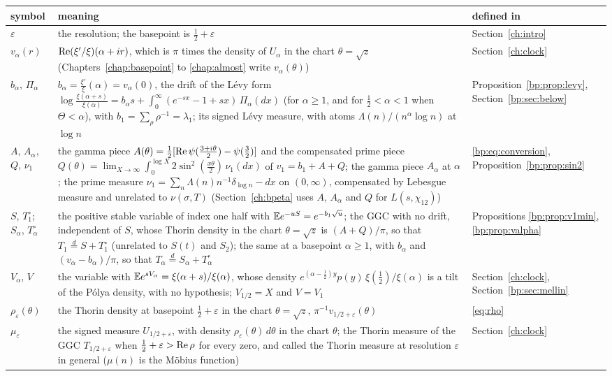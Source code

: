 {\small
\begin{longtable}{@{}p{}p{}p{}@{}}
\toprule
symbol & meaning & defined in\\
\midrule
\endhead
$\varepsilon$ & \raggedright the resolution; the basepoint is $\frac12+\varepsilon$ & \raggedright Section~\ref{ch:intro}\tabularnewline
$v_\alpha(r)$ & \raggedright $\operatorname{Re}(\xi'/\xi)(\alpha+ir)$, which is $\pi$ times the density of $U_\alpha$ in the chart $\theta=\sqrt z$ (Chapters~\ref{chap:basepoint} to \ref{chap:almost} write $v_\alpha(\theta)$) & \raggedright Section~\ref{ch:clock}\tabularnewline
$b_\alpha$, $\Pi_\alpha$ & \raggedright $b_\alpha=\frac{\xi'}\xi(\alpha)=v_\alpha(0)$, the drift of the L\'evy form $\log\frac{\xi(\alpha+s)}{\xi(\alpha)}=b_\alpha s+\int_0^\infty(e^{-sx}-1+sx)\,\Pi_\alpha(dx)$ (for $\alpha\ge1$, and for $\frac12<\alpha<1$ when $\Theta<\alpha$), with $b_1=\sum_\rho\rho^{-1}=\lambda_1$; its signed L\'evy measure, with atoms $\Lambda(n)/(n^\alpha\log n)$ at $\log n$ & \raggedright Proposition~\ref{bp:prop:levy}, Section~\ref{bp:sec:below}\tabularnewline
$A$, $A_\alpha$, $Q$, $\nu_1$ & \raggedright the gamma piece $A(\theta)=\frac12[\operatorname{Re}\psi(\frac{3+i\theta}2)-\psi(\frac32)]$ and the compensated prime piece $Q(\theta)=\lim_{X\to\infty}\int_0^{\log X}2\sin^2(\frac{x\theta}2)\,\nu_1(dx)$ of $v_1=b_1+A+Q$; the gamma piece $A_\alpha$ at $\alpha$; the prime measure $\nu_1=\sum_n\Lambda(n)n^{-1}\delta_{\log n}-dx$ on $(0,\infty)$, compensated by Lebesgue measure and unrelated to $\nu(\sigma,T)$ (Section~\ref{ch:bpeta} uses $A$, $A_\alpha$ and $Q$ for $L(s,\chi_{12})$) & \raggedright \eqref{bp:eq:conversion}, Proposition~\ref{bp:prop:sin2}\tabularnewline
$S$, $T_1^\circ$; $S_\alpha$, $T_\alpha^\circ$ & \raggedright the positive stable variable of index one half with $\mathbb{E} e^{-uS}=e^{-b_1\sqrt u}$; the GGC with no drift, independent of $S$, whose Thorin density in the chart $\theta=\sqrt z$ is $(A+Q)/\pi$, so that $T_1\stackrel d=S+T_1^\circ$ (unrelated to $S(t)$ and $S_2$); the same at a basepoint $\alpha\ge1$, with $b_\alpha$ and $(v_\alpha-b_\alpha)/\pi$, so that $T_\alpha\stackrel d=S_\alpha+T_\alpha^\circ$ & \raggedright Propositions \ref{bp:prop:v1min}, \ref{bp:prop:valpha}\tabularnewline
$V_\alpha$, $V$ & \raggedright the variable with $\mathbb{E} e^{sV_\alpha}=\xi(\alpha+s)/\xi(\alpha)$, whose density $e^{(\alpha-\frac12)y}p(y)\,\xi(\frac12)/\xi(\alpha)$ is a tilt of the P\'olya density, with no hypothesis; $V_{1/2}=X$ and $V=V_1$ & \raggedright Section~\ref{ch:clock}, Section~\ref{bp:sec:mellin}\tabularnewline
$\rho_\varepsilon(\theta)$ & \raggedright the Thorin density at basepoint $\frac12+\varepsilon$ in the chart $\theta=\sqrt z$, $\pi^{-1}v_{1/2+\varepsilon}(\theta)$ & \raggedright \eqref{eq:rho}\tabularnewline
$\mu_\varepsilon$ & \raggedright the signed measure $U_{1/2+\varepsilon}$, with density $\rho_\varepsilon(\theta)\,d\theta$ in the chart $\theta$; the Thorin measure of the GGC $T_{1/2+\varepsilon}$ when ${\frac12+\varepsilon>\operatorname{Re}\rho}$ for every zero, and called the Thorin measure at resolution $\varepsilon$ in general ($\mu(n)$ is the M\"obius function) & \raggedright Section~\ref{ch:clock}\tabularnewline
\bottomrule
\end{longtable}}

